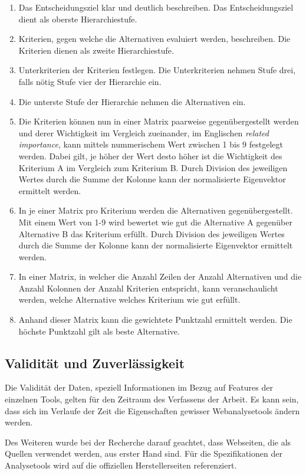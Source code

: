 \begin{enumerate}
  \item Das Entscheidungsziel klar und deutlich beschreiben. Das Entscheidungsziel dient als oberste Hierarchiestufe.
  \item Kriterien, gegen welche die Alternativen evaluiert werden, beschreiben. Die Kriterien dienen als zweite Hierarchiestufe.
  \item Unterkriterien der Kriterien festlegen. Die Unterkriterien nehmen Stufe drei, falls nötig Stufe vier der Hierarchie ein.
  \item Die unterste Stufe der Hierarchie nehmen die Alternativen ein.
  \item Die Kriterien können nun in einer Matrix paarweise gegenübergestellt werden und derer Wichtigkeit im Vergleich zueinander, im Englischen \textit{related importance}, kann mittels nummerischem Wert zwischen 1 bis 9 festgelegt werden. Dabei gilt, je höher der Wert desto höher ist die Wichtigkeit des Kriterium A im Vergleich zum Kriterium B. Durch Division des jeweiligen Wertes durch die Summe der Kolonne kann der normalisierte Eigenvektor ermittelt werden.
  \item In je einer Matrix pro Kriterium werden die Alternativen gegenübergestellt. Mit einem Wert von 1-9 wird bewertet wie gut die Alternative A gegenüber Alternative B das Kriterium erfüllt. Durch Division des jeweiligen Wertes durch die Summe der Kolonne kann der normalisierte Eigenvektor ermittelt werden.
  \item In einer Matrix, in welcher die Anzahl Zeilen der Anzahl Alternativen und die Anzahl Kolonnen der Anzahl Kriterien entspricht, kann veranschaulicht werden, welche Alternative welches Kriterium wie gut erfüllt.
  \item Anhand dieser Matrix kann die gewichtete Punktzahl ermittelt werden. Die höchste Punktzahl gilt als beste Alternative.
\end{enumerate} 

\subsection{Validität und Zuverlässigkeit}
Die Validität der Daten, speziell Informationen im Bezug auf Features der einzelnen Tools, gelten für den Zeitraum des Verfassens der Arbeit. Es kann sein, dass sich im Verlaufe der Zeit die Eigenschaften gewisser Webanalysetools ändern werden. 

Des Weiteren wurde bei der Recherche darauf geachtet, dass Webseiten, die als Quellen verwendet werden, aus erster Hand sind. Für die Spezifikationen der Analysetools wird auf die offiziellen Herstellerseiten referenziert.

